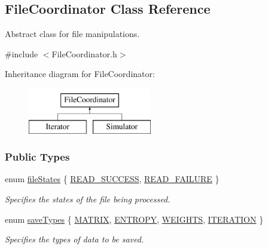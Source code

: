 \hypertarget{class_file_coordinator}{\subsection{File\+Coordinator Class Reference}
\label{class_file_coordinator}
}


Abstract class for file manipulations.  




{\ttfamily \#include $<$File\+Coordinator.\+h$>$}

Inheritance diagram for File\+Coordinator\+:\begin{figure}[H]
\begin{center}
\leavevmode
\includegraphics[height=2.000000cm]{class_file_coordinator}
\end{center}
\end{figure}
\subsubsection*{Public Types}
\begin{DoxyCompactItemize}
\item 
enum \hyperlink{class_file_coordinator_a87882b51519fff558b11f4862a021318}{file\+States} \{ \hyperlink{class_file_coordinator_a87882b51519fff558b11f4862a021318af1c825462619cd97356c2609113e828c}{R\+E\+A\+D\+\_\+\+S\+U\+C\+C\+E\+S\+S}, 
\hyperlink{class_file_coordinator_a87882b51519fff558b11f4862a021318adad0373980186384b160efe041ed22bd}{R\+E\+A\+D\+\_\+\+F\+A\+I\+L\+U\+R\+E}
 \}
\begin{DoxyCompactList}\small\item\em Specifies the states of the file being processed. \end{DoxyCompactList}\item 
enum \hyperlink{class_file_coordinator_a3675d464de774750ec143958d199891e}{save\+Types} \{ \hyperlink{class_file_coordinator_a3675d464de774750ec143958d199891ea0e8f89951a9591e7c4c9c98c79514b45}{M\+A\+T\+R\+I\+X}, 
\hyperlink{class_file_coordinator_a3675d464de774750ec143958d199891eaf405bb89eede8cfbb12aefb8c0f230b4}{E\+N\+T\+R\+O\+P\+Y}, 
\hyperlink{class_file_coordinator_a3675d464de774750ec143958d199891ea35b0a6cf33dc95857927320bfd6acce5}{W\+E\+I\+G\+H\+T\+S}, 
\hyperlink{class_file_coordinator_a3675d464de774750ec143958d199891ea25e4073fbd44c81e075066787b33a5de}{I\+T\+E\+R\+A\+T\+I\+O\+N}
 \}
\begin{DoxyCompactList}\small\item\em Specifies the types of data to be saved. \end{DoxyCompactList}\end{DoxyCompactItemize}
